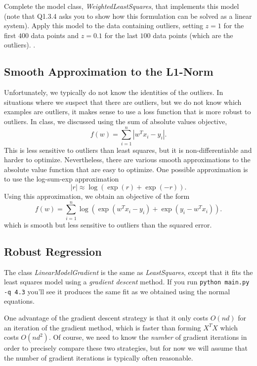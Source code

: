 \documentclass{article}
\begin{document}
Complete the model class, \emph{WeightedLeastSquares}, that implements this model 
(note that Q1.3.4 asks you to show how this formulation can be solved as a linear system).
Apply this model to the data containing outliers, setting $z = 1$ for the first 
$400$ data points and $z = 0.1$ for the last $100$ data points (which are the outliers). 
.


\subsection{Smooth Approximation to the L1-Norm}

Unfortunately, we typically do not know the identities of the outliers. In situations where we suspect that there are outliers, but we do not know which examples are outliers, it makes sense to use a loss function that is more robust to outliers. In class, we discussed using the sum of absolute values objective,
\[
f(w) = \sum_{i=1}^n |w^Tx_i - y_i|.
\]
This is less sensitive to outliers than least squares, but it is non-differentiable and harder to optimize. Nevertheless, there are various smooth approximations to the absolute value function that are easy to optimize. One possible approximation is to use the log-sum-exp approximation
\[
|r| \approx \log(\exp(r) + \exp(-r)).
\]
Using this approximation, we obtain an objective of the form
\[
f(w) {=} \sum_{i=1}^n  \log\left(\exp(w^Tx_i - y_i) + \exp(y_i - w^Tx_i)\right).
\]
which is smooth but less sensitive to outliers than the squared error. 



\subsection{Robust Regression}

The class \emph{LinearModelGradient} is the same as \emph{LeastSquares}, except that it fits the least squares model using a \emph{gradient descent} method. If you run \verb|python main.py -q 4.3| you'll see it produces the same fit as we obtained using the normal equations.

One advantage of the gradient descent strategy is that it only costs $O(nd)$ for an iteration of the gradient method, which is faster than forming $X^TX$ which costs $O(nd^2)$. Of course, we need to know the \emph{number} of gradient iterations in order to precisely compare these two strategies, but for now we will assume that the number of gradient iterations is typically often reasonable.
\end{document}

